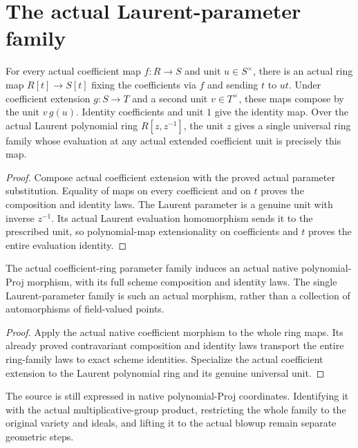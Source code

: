 \section{The actual Laurent-parameter family}

\begin{lemma}
\label{lem:native-parameter-family-rings}
\leanok
For every actual coefficient map $f:R\to S$ and unit $u\in S^\times$,
there is an actual ring map $R[t]\to S[t]$ fixing the coefficients via
$f$ and sending $t$ to $ut$.  Under coefficient extension $g:S\to T$
and a second unit $v\in T^\times$, these maps compose by the unit
$v\,g(u)$.  Identity coefficients and unit $1$ give the identity map.
Over the actual Laurent polynomial ring $R[z,z^{-1}]$, the unit $z$
gives a single universal ring family whose evaluation at any actual
extended coefficient unit is precisely this map.
\end{lemma}
\begin{proof}
Compose actual coefficient extension with the proved actual parameter
substitution.  Equality of maps on every coefficient and on $t$ proves
the composition and identity laws.  The Laurent parameter is a genuine
unit with inverse $z^{-1}$.  Its actual Laurent evaluation homomorphism
sends it to the prescribed unit, so polynomial-map extensionality on
coefficients and $t$ proves the entire evaluation identity.
\end{proof}

\begin{lemma}
\label{lem:native-parameter-family-morphisms}
\leanok
The actual coefficient-ring parameter family induces an actual native
polynomial-Proj morphism, with its full scheme composition and identity
laws.  The single Laurent-parameter family is such an actual morphism,
rather than a collection of automorphisms of field-valued points.
\end{lemma}
\begin{proof}
Apply the actual native coefficient morphism to the whole ring maps.
Its already proved contravariant composition and identity laws
transport the entire ring-family laws to exact scheme identities.
Specialize the actual coefficient extension to the Laurent polynomial
ring and its genuine universal unit.
\end{proof}

The source is still expressed in native polynomial-Proj coordinates.
Identifying it with the actual multiplicative-group product, restricting
the whole family to the original variety and ideals, and lifting it to
the actual blowup remain separate geometric steps.
